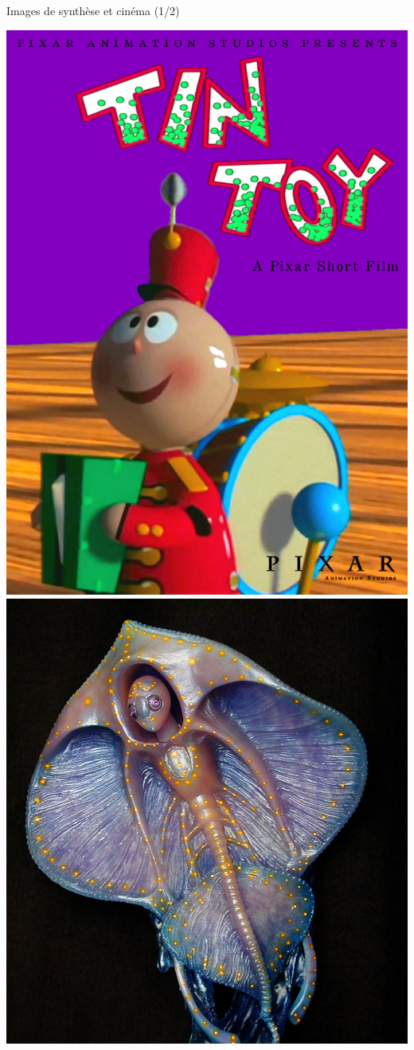 \begin{frame}{Images de synthèse et cinéma (1/2)}
\begin{center}
\hspace{0.1cm}
\includegraphics[height=0.28\textheight]{figs/tintoy.jpg}
\hspace{0.1cm}
\includegraphics[height=0.28\textheight]{figs/abyss.jpg}

\end{center}
\end{frame}
